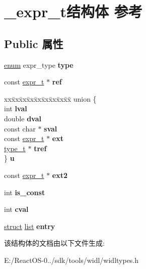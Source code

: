 \hypertarget{struct__expr__t}{}\section{\+\_\+expr\+\_\+t结构体 参考}
\label{struct__expr__t}
\subsection*{Public 属性}
\begin{DoxyCompactItemize}
\item 
\mbox{\label{struct__expr__t_a601e64f095ff845f97f2c19a9020968e}} 
\hyperlink{interfaceenum}{enum} expr\+\_\+type {\bfseries type}
\item 
\mbox{\label{struct__expr__t_ab195ec1bac29de858040a7c171b583d4}} 
const \hyperlink{struct__expr__t}{expr\+\_\+t} $\ast$ {\bfseries ref}
\item 
\mbox{\label{struct__expr__t_a90facbb15f18e0beabe07baf2d8bad85}} 
\begin{tabbing}
xx\=xx\=xx\=xx\=xx\=xx\=xx\=xx\=xx\=\kill
union \{\\
\>int {\bfseries lval}\\
\>double {\bfseries dval}\\
\>const char $\ast$ {\bfseries sval}\\
\>const \hyperlink{struct__expr__t}{expr\_t} $\ast$ {\bfseries ext}\\
\>\hyperlink{struct__type__t}{type\_t} $\ast$ {\bfseries tref}\\
\} {\bfseries u}\\

\end{tabbing}\item 
\mbox{\label{struct__expr__t_a2702917bc053233983b26b07ab097670}} 
const \hyperlink{struct__expr__t}{expr\+\_\+t} $\ast$ {\bfseries ext2}
\item 
\mbox{\label{struct__expr__t_a9643f981c4be25ca2b6314922093f2ab}} 
int {\bfseries is\+\_\+const}
\item 
\mbox{\label{struct__expr__t_ae37bd594d5818460acd8238727d939ea}} 
int {\bfseries cval}
\item 
\mbox{\label{struct__expr__t_a40e68fc653ffc4897802f726cb22bd32}} 
\hyperlink{interfacestruct}{struct} \hyperlink{classlist}{list} {\bfseries entry}
\end{DoxyCompactItemize}


该结构体的文档由以下文件生成\+:\begin{DoxyCompactItemize}
\item 
E\+:/\+React\+O\+S-\/0../sdk/tools/widl/widltypes.\+h\end{DoxyCompactItemize}

